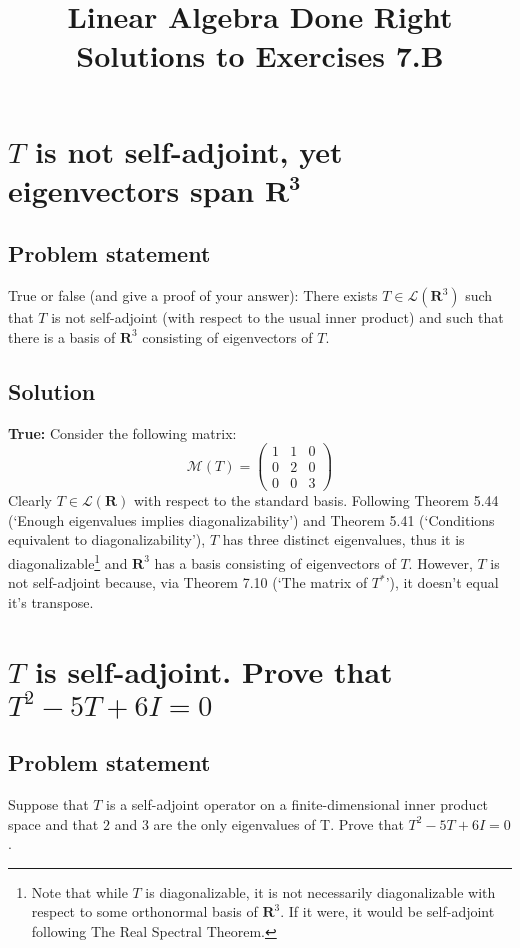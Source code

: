 \documentclass{article}
\title{Linear Algebra Done Right\\Solutions to Exercises 7.B}
\author{}
\date{}
\begin{document}
\maketitle

\section{$T$ is not self-adjoint, yet eigenvectors span $\mathbf{R^3}$}
\subsection*{Problem statement}
True or false (and give a proof of your answer): There exists $T\in\mathcal{L}(\mathbf{R}^3)$ such that $T$ is not self-adjoint (with respect to the usual inner product) and such that there is a basis of $\mathbf{R}^3$ consisting of eigenvectors of $T$.

\subsection*{Solution}
\textbf{True:} Consider the following matrix:
\[\mathcal{M}(T) = \begin{pmatrix}1 & 1 & 0 \\0 & 2 & 0 \\0 & 0 & 3\end{pmatrix}\]
Clearly $T\in\mathcal{L}(\mathbf{R})$ with respect to the standard basis. Following Theorem 5.44 (`Enough eigenvalues implies diagonalizability') and Theorem 5.41 (`Conditions equivalent to diagonalizability'), $T$ has three distinct eigenvalues, thus it is diagonalizable\footnote{Note that while $T$ is diagonalizable, it is not necessarily diagonalizable with respect to some orthonormal basis of $\mathbf{R}^3$. If it were, it would be self-adjoint following The Real Spectral Theorem.} and $\mathbf{R}^3$ has a basis consisting of eigenvectors of $T$. However, $T$ is not self-adjoint because, via Theorem 7.10 (`The matrix of $T^*$'), it doesn't equal it's transpose.

\clearpage

\section{$T$ is self-adjoint. Prove that $T^2-5T+6I=0$}
\subsection*{Problem statement}
Suppose that $T$ is a self-adjoint operator on a finite-dimensional inner product space and that $2$ and $3$ are the only eigenvalues of T. Prove that $T^2-5T+6I=0$.
\end{document}
